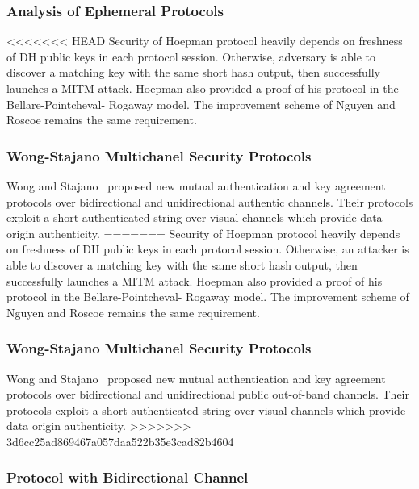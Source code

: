 \subsubsection*{Analysis of Ephemeral Protocols}

<<<<<<< HEAD
Security of Hoepman protocol heavily depends on freshness of DH public keys in each protocol session. Otherwise, adversary is able to discover a matching key with the same short hash output, then successfully launches a MITM attack. Hoepman also provided a proof of his protocol in the Bellare-Pointcheval- Rogaway model. The improvement scheme of Nguyen and Roscoe remains the same requirement. 

\subsubsection{Wong-Stajano Multichanel Security Protocols}\label{WS}

Wong and Stajano~\cite{10.1109/MPRV.2007.76} proposed new mutual authentication and key agreement protocols over bidirectional and unidirectional authentic channels. Their protocols exploit a short authenticated string over visual channels which provide data origin authenticity. 
=======
Security of Hoepman protocol heavily depends on freshness of DH public keys in each protocol session. Otherwise, an attacker is able to discover a matching key with the same short hash output, then successfully launches a MITM attack. Hoepman also provided a proof of his protocol in the Bellare-Pointcheval- Rogaway model. The improvement scheme of Nguyen and Roscoe remains the same requirement. 

\subsubsection{Wong-Stajano Multichanel Security Protocols}\label{WS}

Wong and Stajano~\cite{10.1109/MPRV.2007.76} proposed new mutual authentication and key agreement protocols over bidirectional and unidirectional public out-of-band channels. Their protocols exploit a short authenticated string over visual channels which provide data origin authenticity. 
>>>>>>> 3d6cc25ad869467a057daa522b35e3cad82b4604

\subsubsection*{Protocol with Bidirectional Channel}

